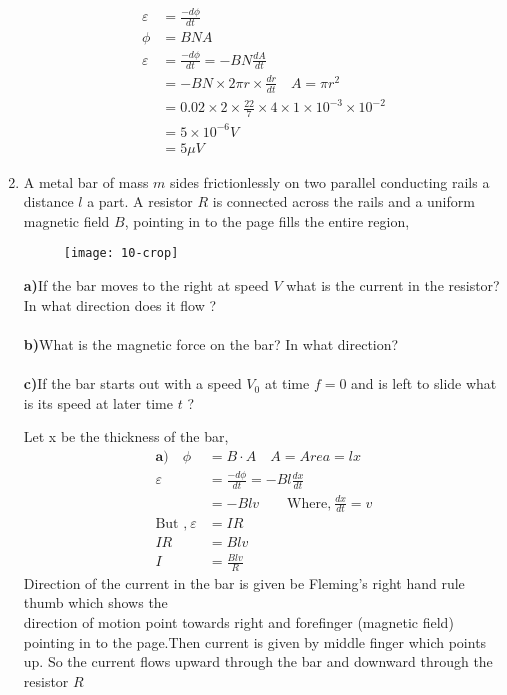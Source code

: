 \begin{enumerate}[ label=\color{ocre}\textbf{\arabic*.}]
	\begin{answer}
		\begin{align*}
		\varepsilon&=\frac{-d\phi}{dt}\\
		\phi&=BNA\\
		\varepsilon&=\frac{-d\phi}{dt}=-BN\frac{dA}{dt}\\
		&=-BN\times2\pi r\times\frac{dr}{dt} \quad A=\pi r^2\\
		&=0.02\times2\times\frac{22}{7}\times4\times1\times10^{-3}\times10^{-2}\\
		&=5\times10^{-6}V\\&=5\mu V
		\end{align*}
	\end{answer}
	\item A metal bar of mass $m$ sides frictionlessly on two parallel conducting rails a distance $l$ a part. A resistor $R$ is connected across the rails and a uniform magnetic field $B$, pointing in to the page fills the entire region,  \\
	\begin{figure}[H]
		\begin{center}
			\texttt{[image: 10-crop]}
		\end{center}
	\end{figure}
	\textbf{a)}\quad If the bar moves to the right at  speed $V$ what is the current in the resistor? In what direction does it flow ?\\\\
	\textbf{b)}\quad What is the magnetic force on the bar? In what direction?\\\\
	\textbf{c)}\quad If the bar starts out with a speed $V_0$ at time $f=0$ and is left to slide what is its speed at later time $t$ ?
	\begin{answer}
		Let x be the thickness of the bar,
		\begin{align*}
		\textbf{a)} \quad\phi&=B\cdot A \quad  A=Area=lx\\
		\varepsilon&=\frac{-d \phi}{d t}=-B l \frac{d x}{d t}\\
		&=-B lv \qquad \text{Where,}\ \frac{dx}{dt}=v\\
		\text{But ,}\  \varepsilon&=I R\\
		I R&=B l v\\
		I&=\frac{B l v}{R}
		\end{align*}
		Direction of the current in the bar is given be  Fleming's right hand rule thumb which shows the\\ direction of motion point towards right and forefinger (magnetic field) pointing in to the page.Then current is given by middle finger which points up. So the current flows upward through the bar and downward through the resistor $R$\\

\end{answer}
\end{enumerate}
